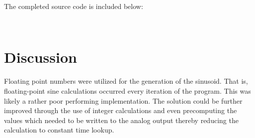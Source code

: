 \documentclass[a4paper, 12pt]{article}
\begin{document}
The completed source code is included below: \newline
\newline
\newline
\begin{verbatim}


\end{verbatim}

\section*{Discussion}
Floating point numbers were utilized for the generation of the sinusoid. That is, floating-point sine calculations occurred every iteration of the program. This was likely a rather poor performing implementation. The solution could be further improved through the use of integer calculations and even precomputing the values which needed to be written to the analog output thereby reducing the calculation to constant time lookup. 
\end{document}
